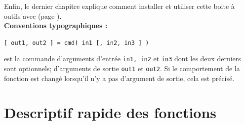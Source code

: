     Enfin, le dernier chapitre explique comment installer et
    utiliser cette boite {\`a} outils avec \matlab (page
    \pageref{secutilisation}).\\

    \bigskip
    \textbf{Conventions typographiques :}\\
    \begin{center}
           {\tt [ out1, out2 ] = cmd( in1 [, in2, in3 ] ) }
    \end{center}
    est la commande  d'arguments d'entr{\'e}e {\tt in1,
    in2} et {\tt in3} dont les deux derniers sont optionnels;
    d'arguments de sortie {\tt out1} et {\tt out2}. Si le
    comportement de la fonction est chang{\'e} lorsqu'il n'y a pas
    d'argument de sortie, cela est pr{\'e}cis{\'e}.


\section*{Descriptif rapide des fonctions}

